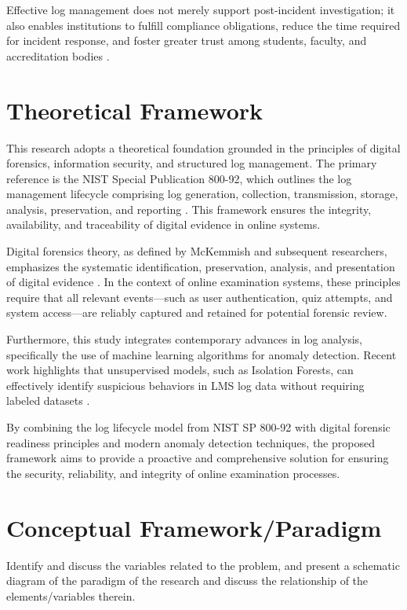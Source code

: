 Effective log management does not merely support post-incident investigation; it also enables institutions to fulfill compliance obligations, reduce the time required for incident response, and foster greater trust among students, faculty, and accreditation bodies \cite{rivera2019towards, abd2024enhancing}.
\section{Theoretical Framework}

This research adopts a theoretical foundation grounded in the principles of digital forensics, information security, and structured log management. The primary reference is the NIST Special Publication 800-92, which outlines the log management lifecycle comprising log generation, collection, transmission, storage, analysis, preservation, and reporting \cite{kentnist800922006guide}. This framework ensures the integrity, availability, and traceability of digital evidence in online systems.

Digital forensics theory, as defined by McKemmish and subsequent researchers, emphasizes the systematic identification, preservation, analysis, and presentation of digital evidence \cite{mckemmish1999}. In the context of online examination systems, these principles require that all relevant events—such as user authentication, quiz attempts, and system access—are reliably captured and retained for potential forensic review.

Furthermore, this study integrates contemporary advances in log analysis, specifically the use of machine learning algorithms for anomaly detection. Recent work highlights that unsupervised models, such as Isolation Forests, can effectively identify suspicious behaviors in LMS log data without requiring labeled datasets \cite{garg2023preserving, lintang2024log}.

By combining the log lifecycle model from NIST SP 800-92 with digital forensic readiness principles and modern anomaly detection techniques, the proposed framework aims to provide a proactive and comprehensive solution for ensuring the security, reliability, and integrity of online examination processes.

\section{Conceptual Framework/Paradigm}

Identify and discuss the variables related to the problem, and present a schematic diagram of the paradigm of the research and discuss the relationship of the elements/variables therein.


